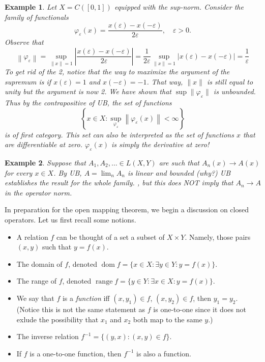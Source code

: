 \documentclass[letterpaper,twoside,11pt]{article}
\theoremstyle{mystyle}
\newtheorem*{ex}{Example}
\newcommand{\cg}{\color{gray}}
\newcommand{\cbk}{\color{black}}
\begin{document}
\begin{ex}
  Let $X = C([0, 1])$ equipped with the sup-norm. Consider the family of functionals 
  \[\varphi_\varepsilon(x) = \frac{x(\varepsilon)-x(-\varepsilon)}{2\varepsilon}, \quad \varepsilon>0. \]
  Observe that 
  \[\left\| {{\varphi _\varepsilon }} \right\| = \mathop {\sup }\limits_{\left\| x \right\| = 1} \left| {\frac{{x\left( \varepsilon  \right) - x\left( { - \varepsilon } \right)}}{{2\varepsilon }}} \right| = \frac{1}{{2\varepsilon }}\mathop {\sup }\limits_{\left\| x \right\| = 1} \left| {x\left( \varepsilon  \right) - x\left( { - \varepsilon } \right)} \right| = \frac{1}{\varepsilon }\]
  \cg To get rid of the 2, notice that the way to maximize the argument of the supremum is if $x(\varepsilon) = 1$ and $x(-\varepsilon) = -1$. That way, $\|x\|$ is still equal to unity but the argument is now 2. \cbk
  We have shown that $\sup \|\varphi_\varepsilon\|$ is unbounded. Thus by the contrapositive of UB, the set of functions \[\left\{ {x \in X:\mathop {\sup }\limits_{{\varphi _\varepsilon }} \left\| {{\varphi _\varepsilon }\left( x \right)} \right\| < \infty } \right\}\] is of first category. \cg This set can also be interpreted as the set of functions $x$ that are differentiable at zero. $\varphi_\varepsilon(x)$ is simply the derivative at zero!\cbk
\end{ex}

\begin{ex}
  Suppose that $A_1, A_2, \dots \in L(X, Y)$ are such that $A_n(x) \to A(x)$ for every $x\in X$. By UB, $A = \lim_n A_n$ is linear and bounded \cg (why?) UB establishes the result for the whole family. \cbk, but this does NOT imply that $A_n \to A$ in the operator norm. 
\end{ex}

In preparation for the open mapping theorem, we begin a discussion on closed operators. Let us first recall some notions. 
\begin{itemize}
  \item A relation $f$ can be thought of a set a subset of $X\times Y$. Namely, those pairs $(x, y)$ such that $y = f(x)$. 
  \item The domain of $f$, denoted $\mathop{dom}f =\{x\in X: \exists y\in Y : y = f(x)\}$. 
  \item The range of $f$, denoted $\mathop{range}f = \{y\in Y: \exists x\in X: y = f(x)\}$. 
  \item We say that $f$ is a \textit{function} iff $(x, y_1) \in f$, $(x, y_2) \in f$, then $y_1 = y_2$. \cg(Notice this is not the same statement as $f$ is one-to-one since it does not exlude the possibility that $x_1$ and $x_2$ both map to the same $y$.)\cbk
  \item The inverse relation $f^{-1} = \{(y, x) : (x, y)\in f\}$. 
  \item If $f$ is a one-to-one function, then $f^{-1}$ is also a function. 
\end{itemize}
\end{document}
